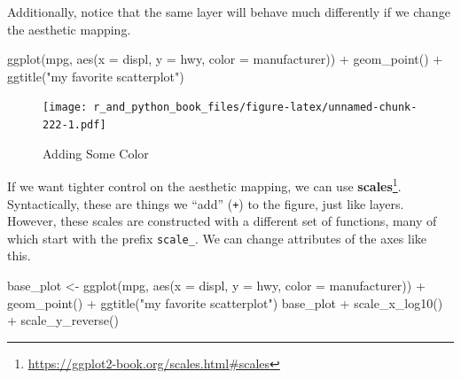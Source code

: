 \documentclass[
  12pt,
  krantz2]{krantz}
\makeatletter
\newenvironment{Shaded}{\begin{snugshade}}{\end{snugshade}}
\newcommand{\AttributeTok}[1]{\textcolor[rgb]{0.61,0.61,0.61}{#1}}
\newcommand{\FunctionTok}[1]{\textcolor[rgb]{0,0,0}{#1}}
\newcommand{\NormalTok}[1]{#1}
\newcommand{\OtherTok}[1]{\textcolor[rgb]{0.37,0.37,0.37}{#1}}
\newcommand{\SpecialCharTok}[1]{\textcolor[rgb]{0,0,0}{#1}}
\newcommand{\StringTok}[1]{\textcolor[rgb]{0.5,0.5,0.5}{#1}}
\renewcommand{\href}[2]{#2\footnote{\url{#1}}}
\newenvironment{kframe}{%
\medskip{}
\setlength{\fboxsep}{.8em}
 \def\at@end@of@kframe{}%
 \ifinner\ifhmode%
  \def\at@end@of@kframe{\end{minipage}}%
  \begin{minipage}{\columnwidth}%
 \fi\fi%
 \def\FrameCommand##1{\hskip\@totalleftmargin \hskip-\fboxsep
 \colorbox{shadecolor}{##1}\hskip-\fboxsep
     \hskip-\linewidth \hskip-\@totalleftmargin \hskip\columnwidth}%
 \MakeFramed {\advance\hsize-\width
   \@totalleftmargin\z@ \linewidth\hsize
   \@setminipage}}%
 {\par\unskip\endMakeFramed%
 \at@end@of@kframe}
\renewenvironment{Shaded}{\begin{kframe}}{\end{kframe}}
\makeatother
\begin{document}
Additionally, notice that the same layer will behave much differently if we change the aesthetic mapping.

\begin{Shaded}
\begin{Highlighting}[]
\FunctionTok{ggplot}\NormalTok{(mpg, }\FunctionTok{aes}\NormalTok{(}\AttributeTok{x =}\NormalTok{ displ, }\AttributeTok{y =}\NormalTok{ hwy, }\AttributeTok{color =}\NormalTok{ manufacturer))  }\SpecialCharTok{+}
  \FunctionTok{geom\_point}\NormalTok{() }\SpecialCharTok{+} 
  \FunctionTok{ggtitle}\NormalTok{(}\StringTok{"my favorite scatterplot"}\NormalTok{)}
\end{Highlighting}
\end{Shaded}

\begin{figure}
\centering
\texttt{[image: r\_and\_python\_book\_files/figure-latex/unnamed-chunk-222-1.pdf]}
\caption{\label{fig:unnamed-chunk-222}Adding Some Color}
\end{figure}

If we want tighter control on the aesthetic mapping, we can use \href{https://ggplot2-book.org/scales.html\#scales}{\textbf{scales}}. Syntactically, these are things we ``add'' (\texttt{+}) to the figure, just like layers. However, these scales are constructed with a different set of functions, many of which start with the prefix \texttt{scale\_}. We can change attributes of the axes like this.

\begin{Shaded}
\begin{Highlighting}[]
\NormalTok{base\_plot }\OtherTok{\textless{}{-}} \FunctionTok{ggplot}\NormalTok{(mpg, }
                    \FunctionTok{aes}\NormalTok{(}\AttributeTok{x =}\NormalTok{ displ, }\AttributeTok{y =}\NormalTok{ hwy, }\AttributeTok{color =}\NormalTok{ manufacturer)) }\SpecialCharTok{+}
             \FunctionTok{geom\_point}\NormalTok{() }\SpecialCharTok{+} 
             \FunctionTok{ggtitle}\NormalTok{(}\StringTok{"my favorite scatterplot"}\NormalTok{)}
\NormalTok{base\_plot }\SpecialCharTok{+} \FunctionTok{scale\_x\_log10}\NormalTok{() }\SpecialCharTok{+} \FunctionTok{scale\_y\_reverse}\NormalTok{()}
\end{Highlighting}
\end{Shaded}
\end{document}
